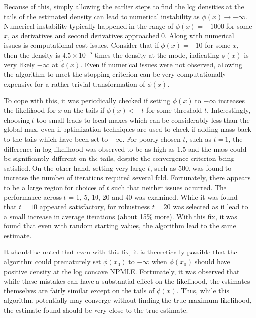 \documentclass[10pt]{article}
\begin{document}
	Because of this, simply allowing the earlier steps to find the log densities	 at the tails of the estimated density can lead to numerical instability as $\phi(x) \rightarrow -\infty$. Numerical instability typically happened in the range of $\phi(x) = -1000$ for some $x$, as derivatives and second derivatives approached 0. Along with numerical issues is computational cost issues. Consider that if $\phi(x) = -10$ for some $x$, then the density is $4.5 \times 10^{-5}$ times the density at the mode, indicating $\phi(x)$ is very likely $-\infty$ at $\hat \phi(x)$. Even if numerical issues were not observed, allowing the algorithm to meet the stopping criterion can be very computationally expensive for a rather trivial transformation of $\phi(x)$. 
	
	To cope with this, it was periodically checked if setting $\phi(x)$ to $-\infty$ increases the likelihood for $x$ on the tails if $\phi(x) < -t$ for some threshold $t$. Interestingly, choosing $t$ too small leads to local maxes which can be considerably less than the global max, even if optimization techniques are used to check if adding mass back to the tails which have been set to $-\infty$. For poorly chosen $t$, such as $t = 1$, the difference in log likelihood was observed to be as high as 1.5 and the mass could be significantly different on the tails, despite the convergence criterion being satisfied. On the other hand, setting very large $t$, such as 500, was found to increase the number of iterations required several fold. Fortunately, there appears to be a large region for choices of $t$ such that neither issues occurred. The performance across $t$ = 1, 5, 10, 20 and 40 was examined. While it was found that $t = 10$ appeared satisfactory, for robustness $t = 20$ was selected as it lead to a small increase in average iterations (about 15\% more). With this fix, it was found that even with random starting values, the algorithm lead to the same estimate. 
	
	It should be noted that even with this fix, it is theoretically possible that the algorithm could prematurely set $\phi(x_0)$ to $-\infty$ when $\phi(x_0)$ should have positive density at the log concave NPMLE. Fortunately, it was observed that while these mistakes can have a substantial effect on the likelihood, the estimates themselves are fairly similar except on the tails of $\phi(x)$. Thus, while this algorithm potentially may converge without finding the true maximum likelihood, the estimate found should be very close to the true estimate. 
			
\end{document}
